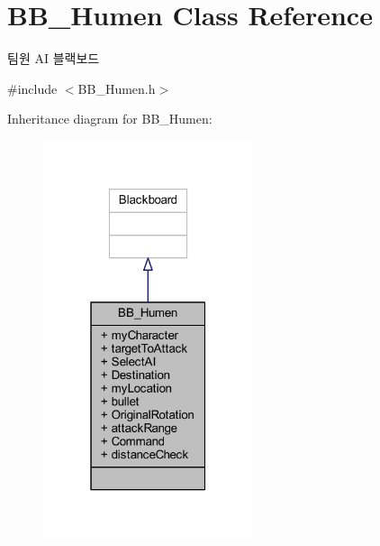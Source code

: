 \hypertarget{class_b_b___humen}{}\section{B\+B\+\_\+\+Humen Class Reference}
\label{class_b_b___humen}


팀원 AI 블랙보드  




{\ttfamily \#include $<$B\+B\+\_\+\+Humen.\+h$>$}



Inheritance diagram for B\+B\+\_\+\+Humen\+:
\nopagebreak
\begin{figure}[H]
\begin{center}
\leavevmode
\includegraphics[width=175pt]{class_b_b___humen__inherit__graph}
\end{center}
\end{figure}


